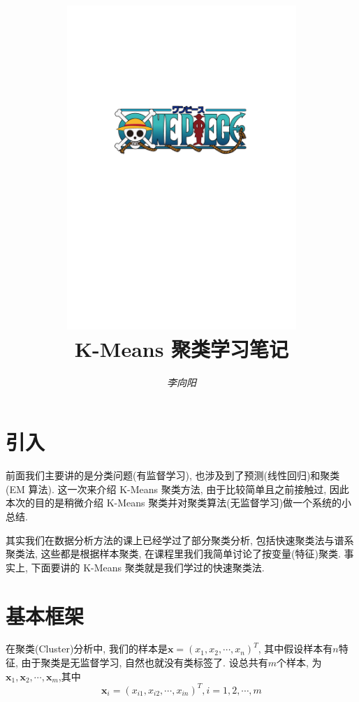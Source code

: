 \documentclass[a4paper,UTF8]{ctexart}
\theoremstyle{plain} \newtheorem{theorem}{定理}[section]
\theoremstyle{plain} \newtheorem{definition}{定义}[section]
\theoremstyle{plain} \newtheorem{lemma}{引理}[section]
\theoremstyle{plain} \newtheorem{proposition}{命题}[section]
\theoremstyle{plain} \newtheorem{example}{例}[section]
\theoremstyle{plain} \newtheorem{remark}{注}[section]
\theoremstyle{plain} \newtheorem{corollary}{推论}[section]
\begin{document}
\title{
\includegraphics[width=0.65\textwidth]{onepiece.pdf}\\
\vspace{2em}
\textbf{K-Means 聚类学习笔记}}
\author{\emph{李向阳}  }
\date{}


\maketitle
\thispagestyle{empty}

\newpage


\tableofcontents

\newpage

\section{引入}
前面我们主要讲的是分类问题(有监督学习), 也涉及到了预测(线性回归)和聚类(EM 算法). 这一次来介绍 K-Means 聚类方法, 由于比较简单且之前接触过, 因此本次的目的是稍微介绍 K-Means 聚类并对聚类算法(无监督学习)做一个系统的小总结.

其实我们在数据分析方法的课上已经学过了部分聚类分析, 包括快速聚类法与谱系聚类法, 这些都是根据样本聚类, 在课程里我们我简单讨论了按变量(特征)聚类. 事实上, 下面要讲的 K-Means 聚类就是我们学过的快速聚类法.


\section{基本框架}
在聚类(Cluster)分析中, 我们的样本是$\bm{x} = (x_1, x_2, \cdots, x_{n})^{T}$, 其中假设样本有$n$特征, 由于聚类是无监督学习, 自然也就没有类标签了. 设总共有$m$个样本, 为$\bm{x}_1, \bm{x}_2, \cdots, \bm{x}_m$,其中
\begin{equation*}
\bm{x}_i = (x_{i1}, x_{i2}, \cdots, x_{in})^{T}, i = 1,2, \cdots, m
\end{equation*}
\end{document}
